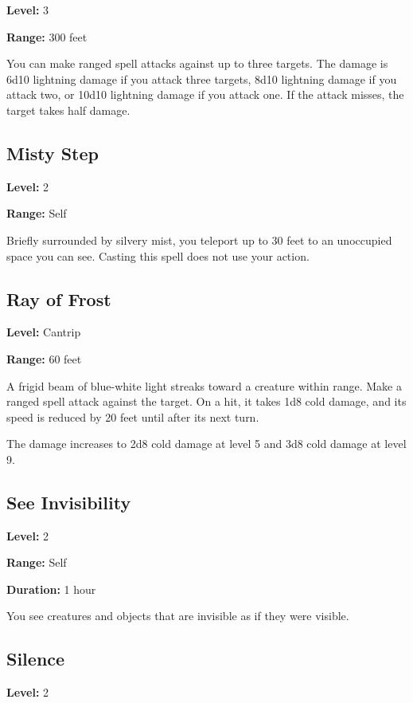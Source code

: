 \documentclass[12pt,letterpaper,twocolumn,openany,nodeprecatedcode,bg=none]{dndbook}
\let\oldsubsection\subsection
\renewcommand{\subsection}[1]{%
  \needspace{5\baselineskip}%
  \oldsubsection{#1}%
}
\begin{document}
\textbf{Level:} 3

\textbf{Range:} 300 feet

You can make ranged spell attacks against up to three targets. The
damage is 6d10 lightning damage if you attack three targets, 8d10
lightning damage if you attack two, or 10d10 lightning damage if you
attack one. If the attack misses, the target takes half damage.

\subsection{Misty Step}\label{misty-step}

\textbf{Level:} 2

\textbf{Range:} Self

Briefly surrounded by silvery mist, you teleport up to 30 feet to an
unoccupied space you can see. Casting this spell does not use your
action.

\newpage

\subsection{Ray of Frost}\label{ray-of-frost}

\textbf{Level:} Cantrip

\textbf{Range:} 60 feet

A frigid beam of blue-white light streaks toward a creature within
range. Make a ranged spell attack against the target. On a hit, it takes
1d8 cold damage, and its speed is reduced by 20 feet until after its
next turn.

The damage increases to 2d8 cold damage at level 5 and 3d8 cold damage
at level 9.

\subsection{See Invisibility}\label{see-invisibility}

\textbf{Level:} 2

\textbf{Range:} Self

\textbf{Duration:} 1 hour

You see creatures and objects that are invisible as if they were
visible.

\subsection{Silence}\label{silence}

\textbf{Level:} 2
\end{document}
